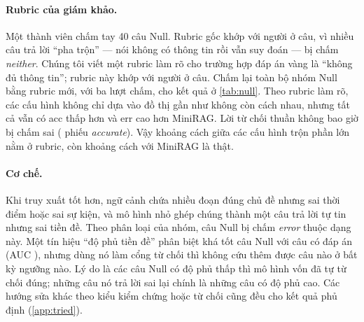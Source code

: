 \paragraph{Rubric của giám khảo.}
Một thành viên chấm tay 40 câu Null. Rubric gốc khớp với người ở \humanAgreeOrig{} câu, vì nhiều câu trả lời ``pha trộn'' --- nói không có thông tin rồi vẫn suy đoán --- bị chấm \emph{neither}.
Chúng tôi viết một rubric làm rõ cho trường hợp đáp án vàng là ``không đủ thông tin''; rubric này khớp với người ở \humanAgreeClar{} câu.
Chấm lại toàn bộ nhóm Null bằng rubric mới, với ba lượt chấm, cho kết quả ở \cref{tab:null}.
Theo rubric làm rõ, các cấu hình không chỉ dựa vào đồ thị gần như không còn cách nhau, nhưng tất cả vẫn có acc thấp hơn và err cao hơn MiniRAG.
Lời từ chối thuần không bao giờ bị chấm sai ( phiếu \emph{accurate}).
Vậy khoảng cách giữa các cấu hình trộn phần lớn nằm ở rubric, còn khoảng cách với MiniRAG là thật.

\begin{table}[t]\centering
\caption{Nhóm Null (45 câu ngoài dev) dưới hai rubric giám khảo, trung bình ba lượt chấm và các lượt sinh. Rubric làm rõ là phân tích độ nhạy, hiệu chuẩn trên nhãn của một người; số chính thức là cột rubric gốc. Rubric làm rõ gần như không dùng nhãn \emph{neither}, nên chỉ nên so acc và err giữa hai cột.}
\label{tab:null}
\small

\end{table}

\paragraph{Cơ chế.}
Khi truy xuất tốt hơn, ngữ cảnh chứa nhiều đoạn đúng chủ đề nhưng sai thời điểm hoặc sai sự kiện, và mô hình nhỏ ghép chúng thành một câu trả lời tự tin nhưng sai tiền đề.
Theo phân loại của nhóm, \nullPremise{} câu Null bị chấm \emph{error} thuộc dạng này.
Một tín hiệu ``độ phủ tiền đề'' phân biệt khá tốt câu Null với câu có đáp án (AUC \premiseAUC), nhưng dùng nó làm cổng từ chối thì không cứu thêm được câu nào ở bất kỳ ngưỡng nào.
Lý do là các câu Null có độ phủ thấp thì mô hình vốn đã tự từ chối đúng; những câu nó trả lời sai lại chính là những câu có độ phủ cao.
Các hướng sửa khác theo kiểu kiểm chứng hoặc từ chối cũng đều cho kết quả phủ định (\cref{app:tried}).

